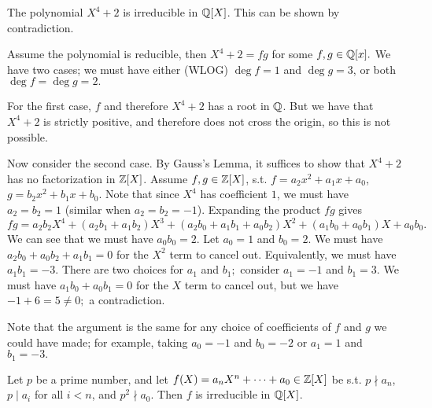 \begin{example}
  The polynomial $X^4+2$ is irreducible in $\mathbb Q[X]$. This can be shown by contradiction.
  
  Assume the polynomial is reducible, then $X^4+2=fg$ for some $f,g \in \mathbb Q[x].$ We have two cases; we must have either (WLOG) $\deg f=1$ and $\deg g =3$, or both $\deg f =\deg g =2.$

  For the first case, $f$ and therefore $X^4+2$ has a root in
  $\mathbb Q$. But we have that $X^4+2$ is strictly positive, and therefore does not cross the origin, so this is not possible.

  Now consider the second case. By Gauss's Lemma, it suffices to show that $X^4+2$ has no factorization in $\mathbb Z[X]$. Assume $f,g\in\mathbb Z[X]$, s.t. $f=a_2x^2+a_1x+a_0$,
  $g=b_2x^2+b_1x+b_0$. Note that since $X^4$ has coefficient $1$, we must have $a_2=b_2=1$ (similar when $a_2=b_2=-1$).
  Expanding the product $fg$ gives
  $$fg=a_2b_2X^4+(a_2b_1+a_1b_2)X^3+(a_2b_0+a_1b_1+a_0b_2)X^2+(a_1b_0+a_0b_1)X+a_0b_0.$$
  We can see that we must have $a_0b_0=2.$ Let $a_0=1$ and $b_0=2.$ 
  We must have $a_2b_0+a_0b_2+a_1b_1=0$ for the $X^2$ term to cancel out. Equivalently, we must have $a_1b_1=-3.$ There are two choices for $a_1$ and $b_1;$
  consider $a_1=-1$ and $b_1=3.$ We must have $a_1b_0+a_0b_1=0$ for the $X$ term to cancel out, but we have $-1+6=5\neq 0;$ a contradiction.

  Note that the argument is the same for any choice of coefficients of $f$ and $g$ we could have made; for example, taking $a_0=-1$ and $b_0=-2$ or $a_1=1$ and $b_1=-3.$
\end{example}

\begin{theorem}
  Let $p$ be a prime number, and let $f(X)=a_nX^n+\cdots+a_0\in \mathbb Z[X]$ be s.t.
  $p\nmid a_n$, $p\mid a_i$ for all $i<n$, and $p^2\nmid a_0$. Then $f$ is
  irreducible in $\mathbb Q[X]$.
  \label{thm:eisensteinCriterion}
\end{theorem}

